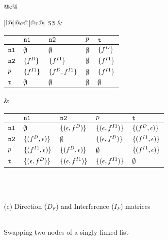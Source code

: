 \begin{figure}
{\begin{tabular}{@{}c@{}}
{\begin{tabular}[b]{|l@{}|@{}c@{}|@{}c@{}|}
{\tt S3} & 
\begin{tabular}{|p{3mm}|p{12mm}p{12mm}p{12mm}p{12mm}|} \hline
            & $\mbox{\tt n1}$  								& $\mbox{\tt n2}$ 				& $p$ 			& $\mbox{\tt t}$ \\ \hline
  $\mbox{\tt n1}$ 	& $\emptyset$							& $\emptyset$			& $\emptyset$	& $\{{f}_{}^{D}\}$ \\ \hline
  $\mbox{\tt n2}$ 	& $\{{f}_{}^{D}\}$					& $\{{f}_{}^{I1}\}$			& $\emptyset$	& $\{{f}_{}^{I1}\}$ \\ \hline
  $p$ 		& $\{{f}_{}^{I1}\}$					& $\{{f}_{}^{D}, {f}_{}^{I1}\}$	& $\emptyset$	& $\{{f}_{}^{I1}\}$ \\ \hline
  $\mbox{\tt t}$ 	& $\emptyset$							& $\emptyset$			& $\emptyset$	& $\emptyset$ \\ \hline
\end{tabular}
 &
\begin{tabular}{|p{3mm}|p{28mm}p{28mm}p{28mm}p{28mm}|} \hline
			& $\mbox{\tt n1}$  							& $\mbox{\tt n2}$ 							& $p$ 			& $\mbox{\tt t}$ \\ \hline
			 $\mbox{\tt n1}$ 	& $\emptyset$						& $\{(\epsilon, {f}_{}^{D})\}$	& $\{(\epsilon, {f}_{}^{I1})\}$	& $\{({f}_{}^{D},\epsilon)\}$ \\ \hline
  $\mbox{\tt n2}$ 	& $\{({f}_{}^{D}, \epsilon)\}$	& $\emptyset$						& $\{(\epsilon, {f}_{}^{D})\}$	& $\{({f}_{}^{I1}, \epsilon)\}$ \\ \hline
  $p$ 		& $\{({f}_{}^{I1}, \epsilon)\}$	& $\{({f}_{}^{D}, \epsilon)\}$	& $\emptyset$	& $\{({f}_{}^{I1}, \epsilon)\}$ \\ \hline
  $\mbox{\tt t}$ 	& $\{(\epsilon, {f}_{}^{D})\}$		& $\{(\epsilon, {f}_{}^{I1})\}$		& $\{(\epsilon, {f}_{}^{I1})\}$	& $\emptyset$ \\ \hline
\end{tabular}  \\ \hline
\end{tabular} 
}  \\
  \footnotesize (c) Direction ($D_F$) and Interference ($I_F$) matrices  \\ \\
\end{tabular}}
\caption{Swapping two nodes of a singly linked list\label{fig:benchmark_2}}
\end{figure}




